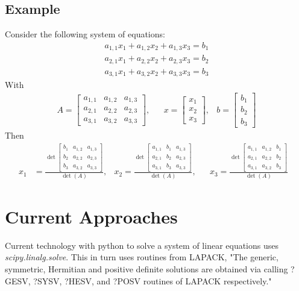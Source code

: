 \documentclass[12pt]{article}
\begin{document}
\subsection*{Example}
Consider the following system of equations:
\begin{align*}
	a_{1,1}x_1 + a_{1,2}x_2 + a_{1,3}x_3 = b_1 \\
	a_{2,1}x_1 + a_{2,2}x_2 + a_{2,3}x_3 = b_2 \\
	a_{3,1}x_1 + a_{3,2}x_2 + a_{3,3}x_3 = b_3
\end{align*}
With
\begin{align*}
	&A = \begin{bmatrix}
		a_{1,1} & a_{1,2} & a_{1,3} \\
		a_{2,1} & a_{2,2} & a_{2,3} \\
		a_{3,1} & a_{3,2} & a_{3,3}
	\end{bmatrix}, &
	&x = \begin{bmatrix}x_1 \\	x_2 \\	x_3	\end{bmatrix}, & 
	b = \begin{bmatrix} b_1 \\	b_2 \\	b_3	\end{bmatrix}&
\end{align*}
Then
\begin{align*}
	x_1 &= \frac{\det\begin{bmatrix}
			b_1 & a_{1,2} & a_{1,3} \\
			b_2 & a_{2,2} & a_{2,3} \\
			b_3 & a_{3,2} & a_{3,3}
		\end{bmatrix}
	}{\det(A)}, &
	x_2 = \frac{\det\begin{bmatrix}
			a_{1,1} & b_1 & a_{1,3} \\
			a_{2,1} & b_2 & a_{2,3} \\
			a_{3,1} & b_3 & a_{3,3}
		\end{bmatrix}
	}{\det(A)}, & &
	x_3 = \frac{\det\begin{bmatrix}
			a_{1,1} & a_{1,2} & b_1 \\
			a_{2,1} & a_{2,2} & b_2 \\
			a_{3,1} & a_{3,2} & b_3
		\end{bmatrix}
	}{\det(A)}&
\end{align*}


\section*{Current Approaches}
Current technology with python to solve a system of linear equations uses \textit{scipy.linalg.solve}. This in turn uses routines from LAPACK, "The generic, symmetric, Hermitian and positive definite solutions are obtained via calling ?GESV, ?SYSV, ?HESV, and ?POSV routines of LAPACK respectively."
\end{document}
